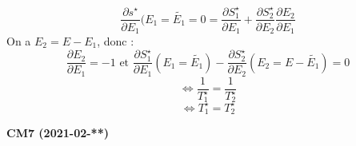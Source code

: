 \documentclass[12pt,a4paper]{report}
\begin{document}
\[
	\dfrac{\partial s^\star}{\partial E_1}(E_1 = \tilde{E_1} = 0 = \dfrac{\partial S_1^\star}{\partial E_1} + \dfrac{\partial S_2^\star}{\partial E_2} \dfrac{\partial E_2}{\partial E_1}
\]
On a \(E_2 = E-E_1\), donc :
\[
	\dfrac{\partial E_2}{\partial E_1} = -1 \text{ et } \dfrac{\partial S_1^\star}{\partial E_1} (E_1 = \tilde{E_1}) - \dfrac{\partial S_2^\star}{\partial E_2} (E_2 = E - \tilde{E_1}) = 0
\]
\[
	\Leftrightarrow \dfrac{1}{T_1^\star} = \dfrac{1}{T_2^\star}
\]
\[
	\Leftrightarrow T_1^\star = T_2^\star
\]

\begin{center}
\textbf{CM7 (2021-02-**)}
\end{center}
\end{document}
